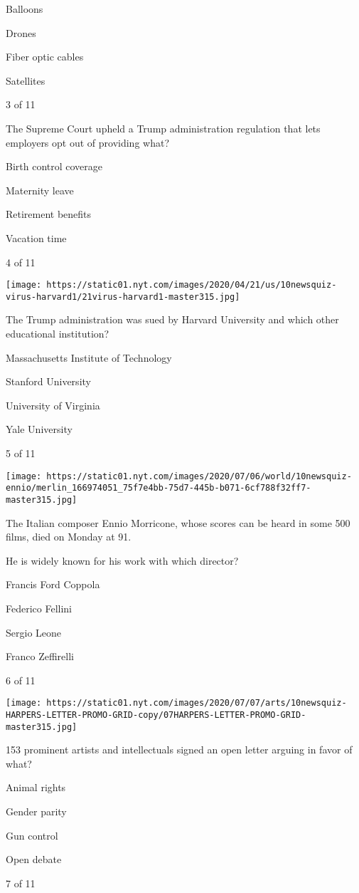Balloons

Drones

Fiber optic cables

Satellites

3 of 11

The Supreme Court upheld a Trump administration regulation that lets
employers opt out of providing what?

Birth control coverage

Maternity leave

Retirement benefits

Vacation time

4 of 11

\texttt{[image: https://static01.nyt.com/images/2020/04/21/us/10newsquiz-virus-harvard1/21virus-harvard1-master315.jpg]}

The Trump administration was sued by Harvard University and which other
educational institution?

Massachusetts Institute of Technology

Stanford University

University of Virginia

Yale University

5 of 11

\texttt{[image: https://static01.nyt.com/images/2020/07/06/world/10newsquiz-ennio/merlin\_166974051\_75f7e4bb-75d7-445b-b071-6cf788f32ff7-master315.jpg]}

The Italian composer Ennio Morricone, whose scores can be heard in some
500 films, died on Monday at 91.

He is widely known for his work with which director?

Francis Ford Coppola

Federico Fellini

Sergio Leone

Franco Zeffirelli

6 of 11

\texttt{[image: https://static01.nyt.com/images/2020/07/07/arts/10newsquiz-HARPERS-LETTER-PROMO-GRID-copy/07HARPERS-LETTER-PROMO-GRID-master315.jpg]}

153 prominent artists and intellectuals signed an open letter arguing in
favor of what?

Animal rights

Gender parity

Gun control

Open debate

7 of 11


